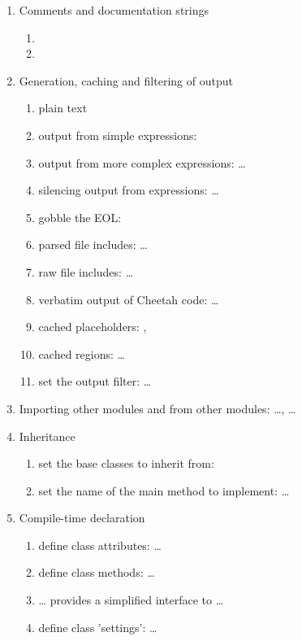 \begin{enumerate}
\item Comments and documentation strings
     \begin{enumerate}
     \item {}
     \item {}
     \end{enumerate}

\item Generation, caching and filtering of output
     \begin{enumerate}
     \item plain text
     \item output from simple expressions: 
     \item output from more complex expressions:  \ldots
     \item silencing output from expressions:  \ldots
     \item gobble the EOL: 
     \item parsed file includes:  \ldots
     \item raw file includes:  \ldots
     \item verbatim output of Cheetah code:  \ldots {}
     \item cached placeholders: , 
     \item cached regions:  \ldots {}
     \item set the output filter:  \ldots
     \end{enumerate}
          
\item Importing other modules and from other modules:  \ldots,
      \ldots

\item Inheritance 
     \begin{enumerate}
     \item set the base classes to inherit from: 
     \item set the name of the main method to implement:  \ldots
     \end{enumerate}

\item Compile-time declaration
     \begin{enumerate}
     \item define class attributes:  \ldots
     \item define class methods:  \ldots {}
     \item {} \ldots {} provides a simplified
          interface to  \ldots {}
     \item define class 'settings':  \ldots {}
     \end{enumerate}


\end{enumerate}
